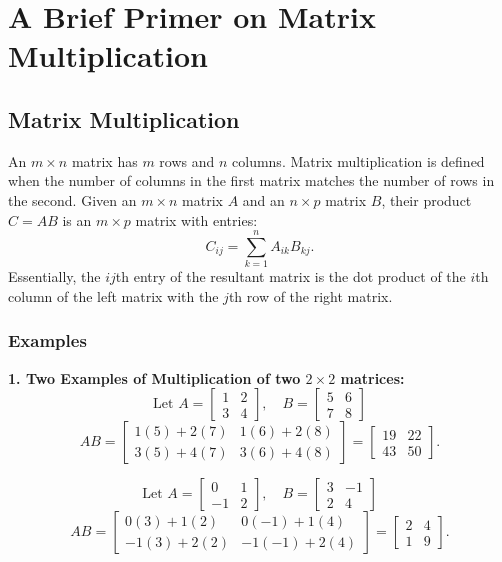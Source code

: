 \setcounter{chapter}{1}
\chapter*{A Brief Primer on Matrix Multiplication}
\addtocounter{chapter}{1} %

\setcounter{section}{0}
\section{Matrix Multiplication}
\label{sec:MatrixMult}
An $m\times n$ matrix has $m$ rows and $n$ columns. Matrix multiplication is defined when the number of columns in the first matrix matches the number of rows in the second. Given an $ m \times n $ matrix $ A $ and an $ n \times p $ matrix $ B $, their product $ C = AB $ is an $ m \times p $ matrix with entries:
\[
C_{ij} = \sum_{k=1}^{n} A_{ik} B_{kj}.
\]
Essentially, the $ij$th entry of the resultant matrix is the dot product of the $i$th column of the left matrix  with the $j$th row of the right matrix.
\subsection{Examples}

\textbf{1. Two Examples of Multiplication of two $ 2 \times 2 $ matrices:}
\[
\text{Let }A = \begin{bmatrix} 1 & 2 \\ 3 & 4 \end{bmatrix}, \quad 
B = \begin{bmatrix} 5 & 6 \\ 7 & 8 \end{bmatrix}
\]
\[
AB = \begin{bmatrix} 1(5) + 2(7) & 1(6) + 2(8) \\ 3(5) + 4(7) & 3(6) + 4(8) \end{bmatrix}
= \begin{bmatrix} 19 & 22 \\ 43 & 50 \end{bmatrix}.
\]

\[
\text{Let }A = \begin{bmatrix} 0 & 1 \\ -1 & 2 \end{bmatrix}, \quad 
B = \begin{bmatrix} 3 & -1 \\ 2 & 4 \end{bmatrix}
\]
\[
AB = \begin{bmatrix} 0(3) + 1(2) & 0(-1) + 1(4) \\ -1(3) + 2(2) & -1(-1) + 2(4) \end{bmatrix}
= \begin{bmatrix} 2 & 4 \\ 1 & 9 \end{bmatrix}.
\]

